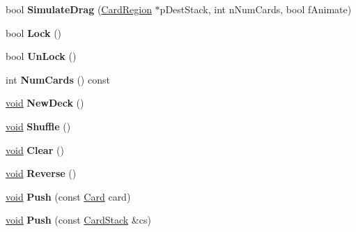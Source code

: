 \begin{DoxyCompactItemize}
\item 
\mbox{\label{class_card_region_ace6248940602faf5f6e94602cb7fb624}} 
bool {\bfseries Simulate\+Drag} (\hyperlink{class_card_region}{Card\+Region} $\ast$p\+Dest\+Stack, int n\+Num\+Cards, bool f\+Animate)
\item 
\mbox{\label{class_card_region_a3e5ece1f5c4b4e0628d12fb536270613}} 
bool {\bfseries Lock} ()
\item 
\mbox{\label{class_card_region_acd0727cd1d3e8b6c4469d382c21f177d}} 
bool {\bfseries Un\+Lock} ()
\item 
\mbox{\label{class_card_region_ab2cad4f930349f2aa7e7c966b4469fb8}} 
int {\bfseries Num\+Cards} () const
\item 
\mbox{\label{class_card_region_a5465f8e3d483b7773b1795f87bf5f847}} 
\hyperlink{interfacevoid}{void} {\bfseries New\+Deck} ()
\item 
\mbox{\label{class_card_region_ac79b59a60fb4a553d94f330c632267b7}} 
\hyperlink{interfacevoid}{void} {\bfseries Shuffle} ()
\item 
\mbox{\label{class_card_region_ac035530c68b009f5234a1bbdc3ea6325}} 
\hyperlink{interfacevoid}{void} {\bfseries Clear} ()
\item 
\mbox{\label{class_card_region_a802372f46b838493cb4549b3393f13c8}} 
\hyperlink{interfacevoid}{void} {\bfseries Reverse} ()
\item 
\mbox{\label{class_card_region_a058a3325585a44573c81e4a436b909d6}} 
\hyperlink{interfacevoid}{void} {\bfseries Push} (const \hyperlink{class_card}{Card} card)
\item 
\mbox{\label{class_card_region_a0ac512ef9c702ea4e57f0068520540b6}} 
\hyperlink{interfacevoid}{void} {\bfseries Push} (const \hyperlink{class_card_stack}{Card\+Stack} \&cs)
\item 
\mbox{\label{class_card_region_ad20bbc34371de8df5ff830e07c7727f4}} 

\end{DoxyCompactItemize}
